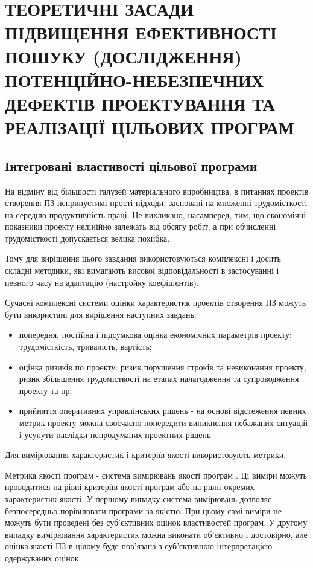 \chapter{ТЕОРЕТИЧНІ ЗАСАДИ ПІДВИЩЕННЯ ЕФЕКТИВНОСТІ ПОШУКУ (ДОСЛІДЖЕННЯ) ПОТЕНЦІЙНО-НЕБЕЗПЕЧНИХ ДЕФЕКТІВ ПРОЕКТУВАННЯ ТА РЕАЛІЗАЦІЇ ЦІЛЬОВИХ ПРОГРАМ}
\label{2section::doc}\label{2section:id1}



\section{Інтегровані властивості цільової програми}
\label{2section:id2}
На відміну від більшості галузей матеріального виробництва, в питаннях проектів створення ПЗ неприпустимі прості підходи, засновані на множенні трудомісткості на середню продуктивність праці. Це викликано, насамперед, тим, що економічні показники проекту нелінійно залежать від обсягу робіт, а при обчисленні трудомісткості допускається велика похибка.

Тому для вирішення цього завдання використовуються комплексні і досить складні методики, які вимагають високої відповідальності в застосуванні і певного часу на адаптацію (настройку коефіцієнтів).

Сучасні комплексні системи оцінки характеристик проектів створення ПЗ можуть бути використані для вирішення наступних завдань:
\begin{itemize}
\item {} 
попередня, постійна і підсумкова оцінка економічних параметрів проекту: трудомісткість, тривалість, вартість;

\item {} 
оцінка ризиків по проекту: ризик порушення строків та невиконання проекту, ризик збільшення трудомісткості на етапах налагодження та супроводження проекту та пр;

\item {} 
прийняття оперативних управлінських рішень - на основі відстеження певних метрик проекту можна своєчасно попередити виникнення небажаних ситуацій і усунути наслідки непродуманих проектних рішень.

\end{itemize}

Для вимірювання характеристик і критеріїв якості використовують метрики.

Метрика якості програм - система вимірювань якості програм . Ці виміри можуть проводитися на рівні критеріїв якості програм або на рівні окремих характеристик якості. У першому випадку система вимірювань дозволяє безпосередньо порівнювати програми за якістю. При цьому самі виміри не можуть бути проведені без суб'єктивних оцінок властивостей програм. У другому випадку вимірювання характеристик можна виконати об'єктивно і достовірно, але оцінка якості ПЗ в цілому буде пов'язана з суб'єктивною інтерпретацією одержуваних оцінок.

